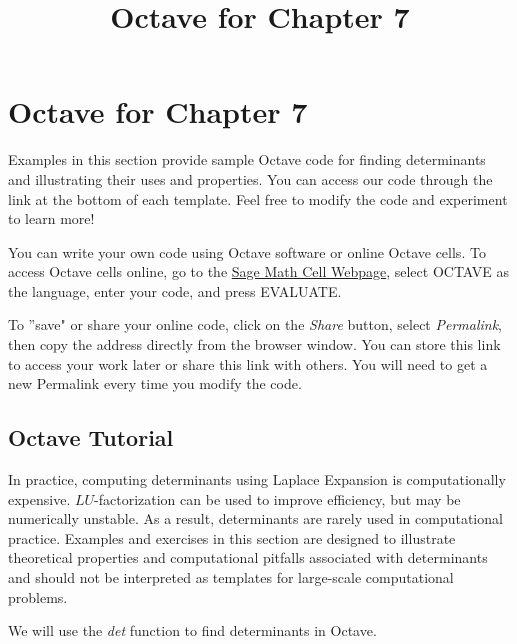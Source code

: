 \documentclass{ximera}
\title{Octave for Chapter 7} \license{CC BY-NC-SA 4.0}
\begin{document}
\begin{abstract}
\end{abstract}
\maketitle

\section*{Octave for Chapter 7}

Examples in this section provide sample Octave code for finding determinants and illustrating their uses and properties. You can access our code through the link at the bottom of each template.  Feel free to modify the code and experiment to learn more!  

You can write your own code using Octave software or online Octave cells.  To access Octave cells online, go to the \href{https://sagecell.sagemath.org/}{Sage Math Cell Webpage}, select OCTAVE as the language, enter your code, and press EVALUATE.  

To ''save" or share your online code, click on the \emph{Share} button, select \emph{Permalink}, then copy the address directly from the browser window.  You can store this link to access your work later or share this link with others.  You will need to get a new Permalink every time you modify the code.

\subsection*{Octave Tutorial}
\begin{warning}
In practice, computing determinants using Laplace Expansion is computationally expensive.  $LU$-factorization can be used to improve efficiency, but may be numerically unstable. As a result, determinants are rarely used in computational practice.  Examples and exercises in this section are designed to illustrate theoretical properties and computational pitfalls associated with determinants and should not be interpreted as templates for large-scale computational problems.
\end{warning}

We will use the \emph{det} function to find determinants in Octave.
\end{document}
